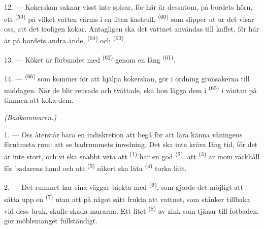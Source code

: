 12. --- Kokerskan saknar visst inte spisar, för här är dessutom, på bordets hörn, ett
 \textsuperscript{(59)} på vilket vatten värms i en liten kastrull.
 \textsuperscript{(60)} som slipper ut ur det visar oss, att det troligen kokar.
Antagligen ska det vattnet användas till kaffet, för här är på bordets andra ände,
 \textsuperscript{(64)} och
 \textsuperscript{(63)}.

13. --- Köket är förbundet med  \textsuperscript{(62)} genom en lång
 \textsuperscript{(61)}.

14. ---  \textsuperscript{(66)} som kommer för att hjälpa kokerskan,
gör i ordning grönsakerna till middagen. När de blir rensade och tvättade, ska hon lägga dem i
 \textsuperscript{(65)} i väntan på timmen att koka dem.

\VUsaut{4.0mm}
{\centering\fontsize{10.2pt}{10.2pt}\selectfont{} \textit{(Badkammaren.)}\par}
\VUsaut{3.0mm}

1. --- Oss återstår bara en indiskretion att begå för att lära känna våningens förnämsta rum:
att se badrummets inredning. Det ska inte kräva lång tid, för det är inte stort, och vi ska
snabbt veta att  \textsuperscript{(1)} har en god 
\textsuperscript{(2)}, att
 \textsuperscript{(3)} är inom räckhåll för badarens hand och
att  \textsuperscript{(5)} säkert ska låta
 \textsuperscript{(4)} torka lätt.

2. --- Det rummet har sina väggar täckta med  \textsuperscript{(6)}, som gjorde
det möjligt att sätta upp en
 \textsuperscript{(7)} utan att på något sätt frukta att
vattnet, som stänker tillbaka vid dess bruk, skulle skada murarna. Ett litet
 \textsuperscript{(8)} av zink som tjänar till fotbaden, gör
möblemanget fullständigt.
\VUsaut{6.0mm}
\VUfilet{22mm}
